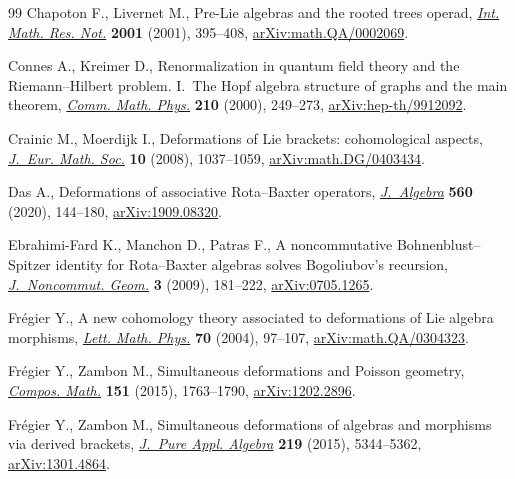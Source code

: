 \documentclass[pdftex]{sigma}%
\numberwithin{equation}{section}
\begin{document}
\begin{thebibliography}{99}
Chapoton F., Livernet M., Pre-{L}ie algebras and the rooted trees operad,
 \href{https://doi.org/10.1155/S1073792801000198}{\textit{Int. Math. Res. Not.}} \textbf{2001} (2001), 395--408,
 \href{https://arxiv.org/abs/math.QA/0002069}{arXiv:math.QA/0002069}.

Connes A., Kreimer D., Renormalization in quantum field theory and the
 {R}iemann--{H}ilbert problem. {I}.~{T}he {H}opf algebra structure of graphs
 and the main theorem, \href{https://doi.org/10.1007/s002200050779}{\textit{Comm. Math. Phys.}} \textbf{210} (2000),
 249--273, \href{https://arxiv.org/abs/hep-th/9912092}{arXiv:hep-th/9912092}.

Crainic M., Moerdijk I., Deformations of {L}ie brackets: cohomological aspects,
 \href{https://doi.org/10.4171/JEMS/139}{\textit{J.~Eur. Math. Soc.}} \textbf{10} (2008), 1037--1059,
 \href{https://arxiv.org/abs/math.DG/0403434}{arXiv:math.DG/0403434}.

Das A., Deformations of associative {R}ota--{B}axter operators,
 \href{https://doi.org/10.1016/j.jalgebra.2020.05.016}{\textit{J.~Algebra}} \textbf{560} (2020), 144--180, \href{https://arxiv.org/abs/1909.08320}{arXiv:1909.08320}.

Ebrahimi-Fard K., Manchon D., Patras F., A noncommutative
 {B}ohnenblust--{S}pitzer identity for {R}ota--{B}axter algebras solves
 {B}ogoliubov's recursion, \href{https://doi.org/10.4171/JNCG/35}{\textit{J.~Noncommut. Geom.}} \textbf{3} (2009),
 181--222, \href{https://arxiv.org/abs/0705.1265}{arXiv:0705.1265}.

Fr\'egier Y., A new cohomology theory associated to deformations of {L}ie
 algebra morphisms, \href{https://doi.org/10.1007/s11005-004-4289-0}{\textit{Lett. Math. Phys.}} \textbf{70} (2004), 97--107,
 \href{https://arxiv.org/abs/math.QA/0304323}{arXiv:math.QA/0304323}.

Fr\'egier Y., Zambon M., Simultaneous deformations and {P}oisson geometry,
 \href{https://doi.org/10.1112/S0010437X15007277}{\textit{Compos. Math.}} \textbf{151} (2015), 1763--1790, \href{https://arxiv.org/abs/1202.2896}{arXiv:1202.2896}.

Fr\'egier Y., Zambon M., Simultaneous deformations of algebras and morphisms
 via derived brackets, \href{https://doi.org/10.1016/j.jpaa.2015.05.018}{\textit{J.~Pure Appl. Algebra}} \textbf{219} (2015),
 5344--5362, \href{https://arxiv.org/abs/1301.4864}{arXiv:1301.4864}.


\end{thebibliography}
\end{document}
